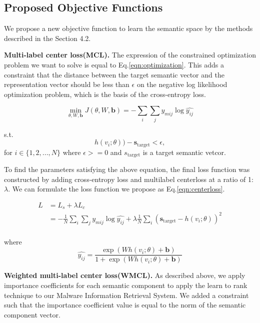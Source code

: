 \subsection{Proposed Objective Functions}
We propose a new objective function to learn the semantic space by the methods described in the Section 4.2.

\textbf{Multi-label center loss(MCL). }
The expression of the constrained optimization problem we want to solve is equal to Eq.\ref{eqn:optimization}. This adds a constraint that the distance between the target semantic vector and the representation vector should be less than $\epsilon$ on the negative log likelihood optimization problem, which is the basis of the cross-entropy loss.



\begin{equation}
\label{eqn:optimization}
\min_{\theta, W, \mathbf{b}} J(\theta, W, \mathbf{b}) = -\sum_i{ \sum_j{ y_{mij} \log{\hat{y_{ij}}}}}
\end{equation}

s.t.
\[
h(v_i;\theta)) - \mathbf{s}_\text{target} < \epsilon ,
\]
for $i \in \{1,2, ..., N\}$ where $\epsilon >= 0$ and $s_\text{target}$ is a target semantic vetcor.

To find the parameters satisfying the above equation, the final loss function was constructed by adding cross-entropy loss and multilabel centerloss at a ratio of 1:$\lambda$\cite{wen2016discriminative}. We can formulate the loss function we propose as Eq.\ref{eqn:centerloss}. 

\begin{equation}
\label{eqn:centerloss}
\begin{aligned}
L &= L_s + \lambda L_c \\
 &= -\frac{1}{N}\sum_i{\sum_j{ y_{mij} \log{\hat{y_{ij}}}}} 
+ \lambda \frac{1}{N} \sum_i{( \mathbf{s}_{\text{target}} - h(v_i;\theta))^2}\\
\end{aligned}
\end{equation}

where 
\[
\hat{y_{ij}} = \frac{\exp(Wh(v_i;\theta)+\mathbf{b})}{ 1 + \exp(Wh(v_i;\theta)+\mathbf{b})}
\]


  
\textbf{Weighted multi-label center loss(WMCL). }
As described above, we apply importance coefficients for each semantic component to apply the learn to rank technique to our Malware Information Retrieval System. We added a constraint such that the importance coefficient value is equal to the norm of the semantic component vector. 

